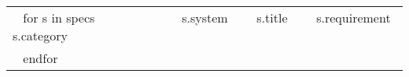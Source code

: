 \documentclass{article}
\begin{document}
\begin{tabular}{C{1in}C{1in}L{2in}L{2in}}
  ~{ for s in specs }~
  ~{{ s.category }}~ & ~{{ s.system }}~ & ~{{ s.title }}~ & ~{{ s.requirement }}~ \\
  ~{ endfor }~
\end{tabular}
\end{document}

